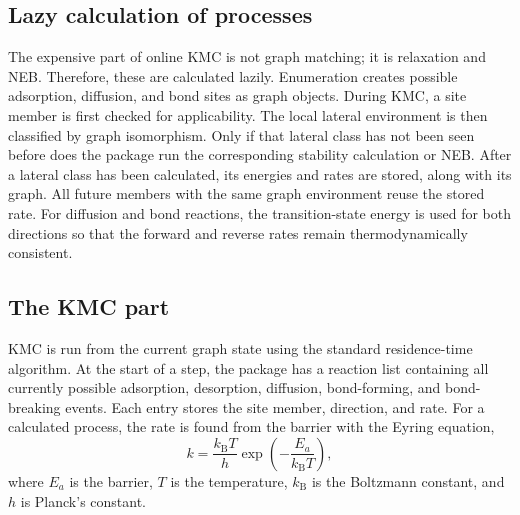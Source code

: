 \subsection{Lazy calculation of processes}
\noindent
The expensive part of online KMC is not graph matching; it is relaxation and NEB.
Therefore, these are calculated lazily.
Enumeration creates possible adsorption, diffusion, and bond sites as graph objects.
During KMC, a site member is first checked for applicability.
The local lateral environment is then classified by graph isomorphism.
Only if that lateral class has not been seen before does the package run the corresponding stability calculation or NEB.
After a lateral class has been calculated, its energies and rates are stored, along with its graph.
All future members with the same graph environment reuse the stored rate.
For diffusion and bond reactions, the transition-state energy is used for both directions so that the forward and reverse rates remain thermodynamically consistent.

\subsection{The KMC part}
\noindent
KMC is run from the current graph state using the standard residence-time algorithm.\cite{bortz1975nfold,gillespie1977ssa}
At the start of a step, the package has a reaction list containing all currently possible adsorption, desorption, diffusion, bond-forming, and bond-breaking events.
Each entry stores the site member, direction, and rate.
For a calculated process, the rate is found from the barrier with the Eyring equation,\cite{eyring1935activated}
\begin{equation}
    k = \frac{k_{\mathrm{B}}T}{h}\exp\left(-\frac{E_a}{k_{\mathrm{B}}T}\right),
\end{equation}
where $E_a$ is the barrier, $T$ is the temperature, $k_{\mathrm{B}}$ is the Boltzmann constant, and $h$ is Planck's constant.


